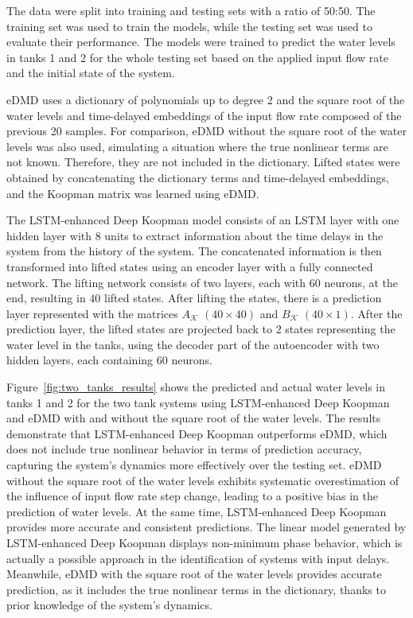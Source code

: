 \documentclass[conference]{IEEEtran}
\begin{document}
The data were split into training and testing sets with a ratio of 50:50. The training set was used to train the models, while the testing set was used to evaluate their performance. The models were trained to predict the water levels in tanks 1 and 2 for the whole testing set based on the applied input flow rate and the initial state of the system.

eDMD uses a dictionary of polynomials up to degree 2 and the square root of the water levels and time-delayed embeddings of the input flow rate composed of the previous 20 samples. For comparison, eDMD without the square root of the water levels was also used, simulating a situation where the true nonlinear terms are not known. Therefore, they are not included in the dictionary. Lifted states were obtained by concatenating the dictionary terms and time-delayed embeddings, and the Koopman matrix was learned using eDMD.

The LSTM-enhanced Deep Koopman model consists of an LSTM layer with one hidden layer with $8$ units to extract information about the time delays in the system from the history of the system. The concatenated information is then transformed into lifted states using an encoder layer with a fully connected network. The lifting network consists of two layers, each with $60$ neurons, at the end, resulting in $40$ lifted states. After lifting the states, there is a prediction layer represented with the matrices $A_\mathcal{K}$ $\left(40 \times 40\right)$ and $B_\mathcal{K}$ $\left(40 \times 1\right)$. After the prediction layer, the lifted states are projected back to $2$ states representing the water level in the tanks, using the decoder part of the autoencoder with two hidden layers, each containing $60$ neurons.

Figure~\ref{fig:two_tanks_results} shows the predicted and actual water levels in tanks 1 and 2 for the two tank systems using LSTM-enhanced Deep Koopman and eDMD with and without the square root of the water levels. The results demonstrate that LSTM-enhanced Deep Koopman outperforms eDMD, which does not include true nonlinear behavior in terms of prediction accuracy, capturing the system's dynamics more effectively over the testing set. eDMD without the square root of the water levels exhibits systematic overestimation of the influence of input flow rate step change, leading to a positive bias in the prediction of water levels. At the same time, LSTM-enhanced Deep Koopman provides more accurate and consistent predictions. The linear model generated by LSTM-enhanced Deep Koopman displays non-minimum phase behavior, which is actually a possible approach in the identification of systems with input delays. Meanwhile, eDMD with the square root of the water levels provides accurate prediction, as it includes the true nonlinear terms in the dictionary, thanks to prior knowledge of the system's dynamics. 
\end{document}
